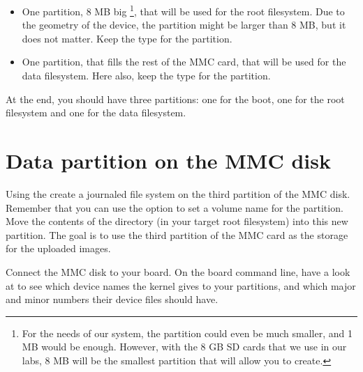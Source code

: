 \begin{itemize}

\item One partition, 8 MB big
  \footnote{For the needs of our system, the partition could even be
  much smaller, and 1 MB would be enough. However, with the 8 GB SD
  cards that we use in our labs, 8 MB will be the smallest partition
  that  will allow you to create.},
  that will be used for the root
  filesystem. Due to the geometry of the device, the partition might
  be larger than 8 MB, but it does not matter. Keep the 
  type for the partition.

\item One partition, that fills the rest of the MMC card, that will be
  used for the data filesystem. Here also, keep the  type
  for the partition.

\end{itemize}

At the end, you should have three partitions: one for the boot, one
for the root filesystem and one for the data filesystem.

\section{Data partition on the MMC disk}


Using the  create a journaled file system on the third
partition of the MMC disk. Remember that you can use the 
option to set a volume name for the partition. Move the contents of
the  directory (in your target root filesystem)
into this new partition. The goal is to use the third partition of the
MMC card as the storage for the uploaded images.

Connect the MMC disk to your board. On the board command line,
have a look at  to see which device names
the kernel gives to your partitions, and which major and minor numbers
their device files should have.
  
